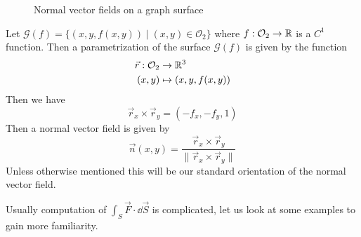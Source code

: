 \documentclass[../Analysis-3]{subfiles}
\begin{document}
\begin{Eg}{}{}
    \begin{figure}
        \centering
        \caption{Normal vector fields on a graph surface}
        \label{fig2:27}
    \end{figure}
    Let $\mathcal{G}(f) = \{ (x,y,f(x,y)) \mid (x,y) \in \mathcal{O}_2\}$ where $f : \mathcal{O}_2 \to \mathbb{R}$ is a $C^1$ function. Then a parametrization of the surface $\mathcal{G}(f)$ is given by the function
    \begin{align*}
        \vec{r} : \mathcal{O}_2 & \to \mathbb{R}^3             \\
        (x,y)                   & \mapsto (x,y,f(x,y))
    \end{align*}
    Then we have
    \[
        \vec{r}_x \times \vec{r}_y = (-f_x, -f_y, 1)
    \]
    Then a normal vector field is given by
    \[
        \vec{n}(x,y) = \frac{\vec{r}_x \times \vec{r}_y}{\|\vec{r}_x \times \vec{r}_y \|}
    \]
    Unless otherwise mentioned this will be our standard orientation of the normal vector field.
\end{Eg}

Usually computation of $\int_S \vec{F} \cdot \dd \vec{S}$ is complicated, let us look at some examples to gain more familiarity.
\end{document}
